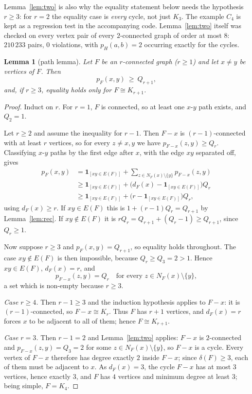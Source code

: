 \documentclass[11pt,a4paper]{article}
\newtheorem{lemma}[theorem]{Lemma}
\theoremstyle{definition}
\newcommand{\nk}[1]{\mathbf{1}_{[#1]}}
\begin{document}
Lemma~\ref{lem:two} is also why the equality statement below needs the
hypothesis $r\ge 3$: for $r=2$ the equality case is \emph{every} cycle, not just
$K_3$.  The example $C_4$ is kept as a regression test in the accompanying
code.  Lemma~\ref{lem:two} itself was checked on every vertex pair of every
$2$-connected graph of order at most $8$: $210\,233$ pairs, $0$ violations,
with $p_H(a,b)=2$ occurring exactly for the cycles.

\begin{lemma}[path lemma]\label{lem:path}
Let $F$ be an $r$-connected graph ($r\ge 1$) and let $x\ne y$ be vertices of
$F$.  Then
\begin{equation}\label{eq:pathlemma}
  p_F(x,y)\ \ge\ Q_{r+1},
\end{equation}
and, if $r\ge 3$, equality holds only for $F\cong K_{r+1}$.
\end{lemma}

\begin{proof}
Induct on $r$.  For $r=1$, $F$ is connected, so at least one $x$-$y$ path
exists, and $Q_2=1$.

Let $r\ge 2$ and assume the inequality for $r-1$.  Then $F-x$ is
$(r-1)$-connected with at least $r$ vertices, so for every $z\ne x,y$ we have
$p_{F-x}(z,y)\ge Q_r$.  Classifying $x$-$y$ paths by the first edge after $x$,
with the edge $xy$ separated off, gives
\begin{align*}
 p_F(x,y)
  &= \nk{xy\in E(F)} + \sum_{z\in N_F(x)\setminus\{y\}} p_{F-x}(z,y)\\
  &\ge \nk{xy\in E(F)} + \bigl(d_F(x)-\nk{xy\in E(F)}\bigr)Q_r\\
  &\ge \nk{xy\in E(F)} + \bigl(r-\nk{xy\in E(F)}\bigr)Q_r ,
\end{align*}
using $d_F(x)\ge r$.  If $xy\in E(F)$ this is $1+(r-1)Q_r=Q_{r+1}$ by
Lemma~\ref{lem:rec}.  If $xy\notin E(F)$ it is
$rQ_r = Q_{r+1}+(Q_r-1)\ge Q_{r+1}$, since $Q_r\ge 1$.

Now suppose $r\ge3$ and $p_F(x,y)=Q_{r+1}$, so equality holds throughout.
The case $xy\notin E(F)$ is then impossible, because $Q_r\ge Q_3=2>1$.  Hence
$xy\in E(F)$, $d_F(x)=r$, and
\[
  p_{F-x}(z,y)=Q_r \quad\text{for every } z\in N_F(x)\setminus\{y\},
\]
a set which is non-empty because $r\ge3$.

\emph{Case $r\ge4$.}  Then $r-1\ge3$ and the induction hypothesis applies to
$F-x$: it is $(r-1)$-connected, so $F-x\cong K_r$.  Thus $F$ has $r+1$
vertices, and $d_F(x)=r$ forces $x$ to be adjacent to all of them; hence
$F\cong K_{r+1}$.

\emph{Case $r=3$.}  Then $r-1=2$ and Lemma~\ref{lem:two} applies: $F-x$ is
$2$-connected and $p_{F-x}(z,y)=Q_3=2$ for some $z\in N_F(x)\setminus\{y\}$,
so $F-x$ is a cycle.  Every vertex of $F-x$ therefore has degree exactly $2$
inside $F-x$; since $\delta(F)\ge 3$, each of them must be adjacent to $x$.  As
$d_F(x)=3$, the cycle $F-x$ has at most $3$ vertices, hence exactly $3$, and
$F$ has $4$ vertices and minimum degree at least $3$; being simple, $F=K_4$.
\end{proof}
\end{document}

